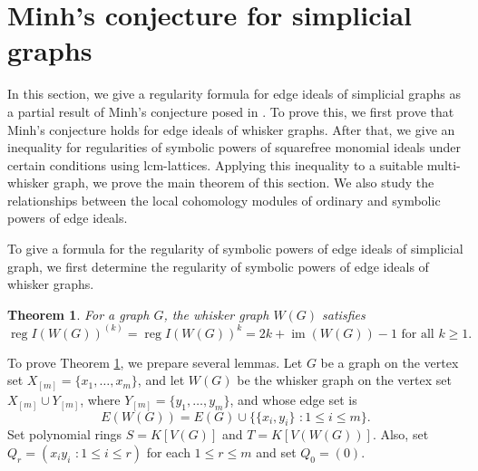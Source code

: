 \documentclass[12pt]{amsart}
\newtheorem{thm}{Theorem}[section]
\theoremstyle{definition}
\theoremstyle{remark}
\DeclareMathOperator{\reg}{reg}
\DeclareMathOperator{\im}{im}
\begin{document}

\section{Minh's conjecture for simplicial graphs}\label{reg}

In this section, we give a regularity formula for edge ideals of simplicial graphs as a partial result of Minh's conjecture posed in \cite[Conjecture A]{mnptv2022}. To prove this, we first prove that Minh's conjecture holds for edge ideals of whisker graphs. After that, we give an inequality for regularities of symbolic powers of squarefree monomial ideals under certain conditions using lcm-lattices. Applying this inequality to a suitable multi-whisker graph, we prove the main theorem of this section. We also study the relationships between the local cohomology modules of ordinary and symbolic powers of edge ideals. 
 
To give a formula for the regularity of symbolic powers of edge ideals of simplicial graph, we first determine the regularity of symbolic powers of edge ideals of whisker graphs. 

\begin{thm}\label{whisker}
For a graph $G$, the whisker graph $W(G)$ satisfies 
$$\reg I(W(G))^{(k)}=\reg I(W(G))^{k}=2k+\im(W(G))-1\mbox{ for all }k\geq1.$$
\end{thm}

To prove Theorem \ref{whisker}, we prepare several lemmas. 
Let $G$ be a graph on the vertex set $X_{[m]}=\{x_{1},\ldots, x_{m}\}$, and let $W(G)$ be the whisker graph on the vertex set $X_{[m]}\cup Y_{[m]}$, where $Y_{[m]}=\{y_{1},\ldots, y_{m}\}$, and whose edge set is
$$E(W(G))=E(G)\cup\{\{x_{i},y_{i}\}\,\,: 1\leq i\leq m\}.$$
Set polynomial rings $S=K[V(G)]$ and $T=K[V(W(G))]$.
Also, set $Q_{r}=(x_{i}y_{i}\,\,: 1\leq i\leq r)$ for each $1\leq r\leq m$ and set $Q_{0}=(0)$.  
\end{document}
